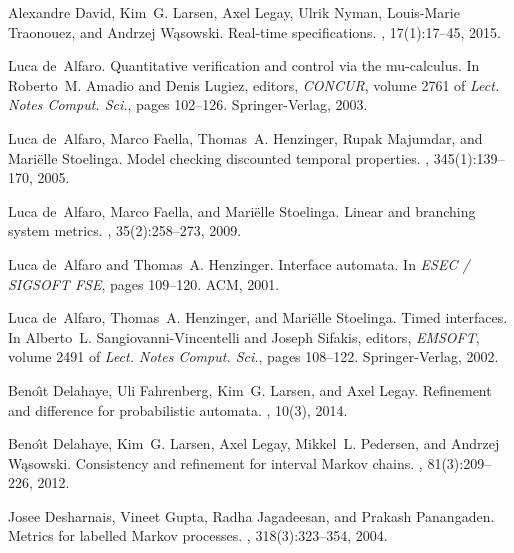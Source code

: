 \documentclass[twocolumn]{svjour3-dummy}
\begin{document}
\begin{thebibliography}{10}
Alexandre David, Kim~G. Larsen, Axel Legay, Ulrik Nyman, Louis{-}Marie
  Traonouez, and Andrzej W{\k a}sowski.
\newblock Real-time specifications.
, 17(1):17--45, 2015.

Luca de~Alfaro.
\newblock Quantitative verification and control via the mu-calculus.
\newblock In Roberto~M. Amadio and Denis Lugiez, editors, {\em CONCUR}, volume
  2761 of {\em {Lect. Notes Comput. Sci.}}, pages 102--126. {Springer-Verlag},
  2003.

Luca de~Alfaro, Marco Faella, Thomas~A. Henzinger, Rupak Majumdar, and
  Mari{\"e}lle Stoelinga.
\newblock Model checking discounted temporal properties.
, 345(1):139--170, 2005.

Luca de~Alfaro, Marco Faella, and Mari{\"e}lle Stoelinga.
\newblock Linear and branching system metrics.
, 35(2):258--273, 2009.

Luca de~Alfaro and Thomas~A. Henzinger.
\newblock Interface automata.
\newblock In {\em ESEC / SIGSOFT FSE}, pages 109--120. ACM, 2001.

Luca de~Alfaro, Thomas~A. Henzinger, and Mari{\"{e}}lle Stoelinga.
\newblock Timed interfaces.
\newblock In Alberto~L. Sangiovanni{-}Vincentelli and Joseph Sifakis, editors,
  {\em EMSOFT}, volume 2491 of {\em {Lect. Notes Comput. Sci.}}, pages
  108--122. {Springer-Verlag}, 2002.

Beno{\^{\i}}t Delahaye, Uli Fahrenberg, Kim~G. Larsen, and Axel Legay.
\newblock Refinement and difference for probabilistic automata.
, 10(3), 2014.

Beno{\^{\i}}t Delahaye, Kim~G. Larsen, Axel Legay, Mikkel~L. Pedersen, and
  Andrzej W{\k a}sowski.
\newblock Consistency and refinement for interval {M}arkov chains.
, 81(3):209--226, 2012.

Josee Desharnais, Vineet Gupta, Radha Jagadeesan, and Prakash Panangaden.
\newblock Metrics for labelled {M}arkov processes.
, 318(3):323--354, 2004.


\end{thebibliography}
\end{document}
